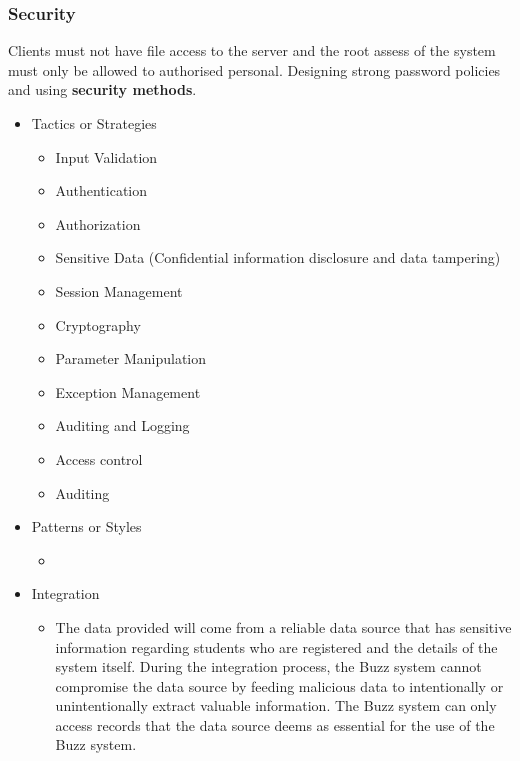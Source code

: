 \subsubsection{Security}
		Clients must not have file access to the server and the root assess of the system must only be allowed to authorised personal. Designing strong password policies and using \textbf{security methods}.
		\begin{itemize}
	\item{Tactics or Strategies}
		\begin{itemize}
			\item Input Validation
			\item Authentication
			\item Authorization
			\item Sensitive Data (Confidential information disclosure and data tampering)
			\item Session Management
			\item Cryptography
			\item Parameter Manipulation
			\item Exception Management
			\item Auditing and Logging
			\item Access control
			\item Auditing
		\end{itemize}
	\item{Patterns or Styles}
		\begin{itemize}
			\item
		\end{itemize}
	\item{Integration}
		\begin{itemize}
			\item  The data provided will come from a reliable data source that has sensitive information regarding students who are registered and the details of the system itself. During the integration process, the Buzz system cannot compromise the data source by feeding malicious data to intentionally or unintentionally extract valuable information. The Buzz system can only access records that the data source deems as essential for the use of the Buzz system.
		\end{itemize}
\end{itemize}

